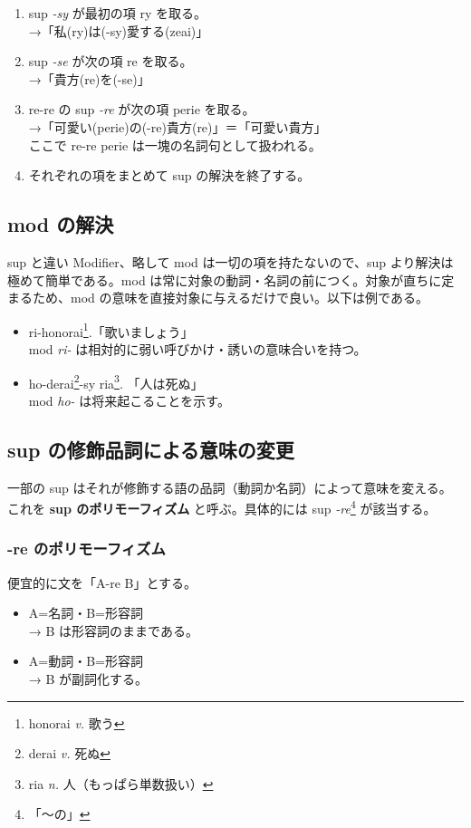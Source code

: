 \begin{enumerate}
    \item sup \emph{-sy} が最初の項 ry を取る。\\ →「私(ry)は(-sy)愛する(zeai)」
    \item sup \emph{-se} が次の項 re を取る。 \\ →「貴方(re)を(-se)」
    \item re-re の sup \emph{-re} が次の項 perie を取る。 \\ →「可愛い(perie)の(-re)貴方(re)」＝「可愛い貴方」\\ ここで re-re perie は一塊の名詞句として扱われる。
    \item それぞれの項をまとめて sup の解決を終了する。
\end{enumerate}

\subsection{mod の解決}

sup と違い Modifier、略して mod は一切の項を持たないので、sup より解決は極めて簡単である。mod は常に対象の動詞・名詞の前につく。対象が直ちに定まるため、mod の意味を直接対象に与えるだけで良い。以下は例である。

\begin{itemize}
    \item ri-honorai\footnote{honorai \emph{v.} 歌う}.「歌いましょう」\\ mod \emph{ri-} は相対的に弱い呼びかけ・誘いの意味合いを持つ。
    \item ho-derai\footnote{derai \emph{v.} 死ぬ}-sy ria\footnote{ria \emph{n.} 人（もっぱら単数扱い）}. 「人は死ぬ」\\ mod \emph{ho-} は将来起こることを示す。
\end{itemize}

\subsection{sup の修飾品詞による意味の変更}

一部の sup はそれが修飾する語の品詞（動詞か名詞）によって意味を変える。これを \textbf{sup のポリモーフィズム} と呼ぶ。具体的には sup \emph{-re}\footnote{「～の」} が該当する。

\subsubsection{-re のポリモーフィズム}

便宜的に文を「A-re B」とする。

\begin{itemize}
    \item A=名詞・B=形容詞 \\ → B は形容詞のままである。
    \item A=動詞・B=形容詞 \\ → B が副詞化する。
\end{itemize}

\clearpage
